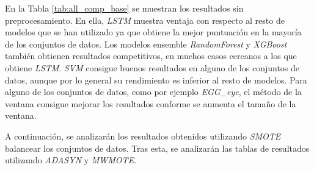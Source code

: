 \newpage
En la Tabla \ref{tab:all_comp_base} se muestran los resultados sin preprocesamiento. En ella, \textit{LSTM} muestra ventaja con respecto al resto de modelos que se han utilizado ya que obtiene la mejor puntuación en la mayoría de los conjuntos de datos. Los modelos ensemble \textit{RandomForest} y \textit{XGBoost} también obtienen resultados competitivos, en muchos casos cercanos a los que obtiene \textit{LSTM}. \textit{SVM} consigue buenos resultados en alguno de los conjuntos de datos, aunque por lo general su rendimiento es inferior al resto de modelos. Para alguno de los conjuntos de datos, como por ejemplo \textit{EGG\_eye}, el método de la ventana consigue mejorar los resultados conforme se aumenta el tamaño de la ventana.\newline


A continuación, se analizarán los resultados obtenidos utilizando \newline \textit{SMOTE} balancear los conjuntos de datos. Tras esta, se analizarán las tablas de resultados utilizando \textit{ADASYN} y \textit{MWMOTE}.


